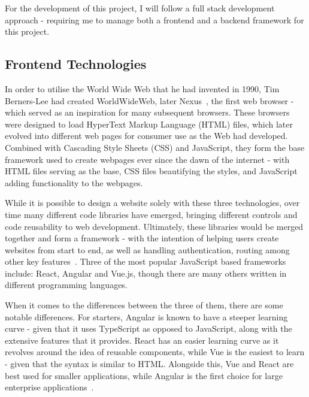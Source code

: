 \documentclass[]{final_report}
\begin{document}


For the development of this project, I will follow a full stack development approach - requiring me to manage both a frontend and a backend framework for this project.

\subsection{Frontend Technologies}

In order to utilise the World Wide Web that he had invented in 1990, Tim Berners-Lee had created WorldWideWeb, later Nexus~\cite{NEXUS}, the first web browser - which served as an inspiration for many subsequent browsers. These browsers were designed to load HyperText Markup Language (HTML) files, which later evolved into different web pages for consumer use as the Web had developed. Combined with Cascading Style Sheets (CSS) and JavaScript, they form the base framework used to create webpages ever since the dawn of the internet - with HTML files serving as the base, CSS files beautifying the styles, and JavaScript adding functionality to the webpages.

While it is possible to design a website solely with these three technologies, over time many different code libraries have emerged, bringing different controls and code reusability to web development. Ultimately, these libraries would be merged together and form a framework - with the intention of helping users create websites from start to end, as well as handling authentication, routing among other key features~\cite{FRAMEWORKS}. Three of the most popular JavaScript based frameworks include: React, Angular and Vue.js, though there are many others written in different programming languages.

When it comes to the differences between the three of them, there are some notable differences. For starters, Angular is known to have a steeper learning curve - given that it uses TypeScript as opposed to JavaScript, along with the extensive features that it provides. React has an easier learning curve as it revolves around the idea of reusable components, while Vue is the easiest to learn - given that the syntax is similar to HTML. Alongside this, Vue and React are best used for smaller applications, while Angular is the first choice for large enterprise applications~\cite{FRAMEWORKS_COMPARE}. 
\end{document}
